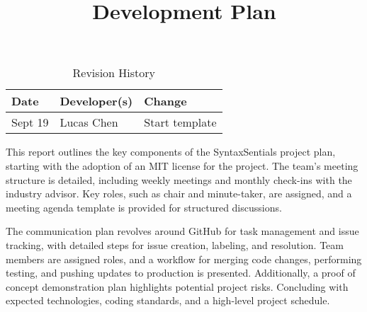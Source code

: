 \documentclass{article}
\title{Development Plan\\\progname}
\author{\authname}
\date{}
\begin{document}
\maketitle

\begin{table}[hp]
\caption{Revision History} \label{TblRevisionHistory}
\begin{tabularx}{\textwidth}{llX}
\toprule
\textbf{Date} & \textbf{Developer(s)} & \textbf{Change}\\
\midrule
Sept 19 & Lucas Chen & Start template\\
\bottomrule
\end{tabularx}
\end{table}

\newpage{}

This report outlines the key components of the SyntaxSentials project plan, 
starting with the adoption of an MIT license for the project. The team's meeting 
structure is detailed, including weekly meetings and monthly check-ins with the 
industry advisor. Key roles, such as chair and minute-taker, are assigned, and a 
meeting agenda template is provided for structured discussions.

The communication plan revolves around GitHub for task management and issue 
tracking, with detailed steps for issue creation, labeling, and resolution. 
Team members are assigned roles, and a workflow for merging code changes, 
performing testing, and pushing updates to production is presented. Additionally, 
a proof of concept demonstration plan highlights potential project risks. Concluding 
with expected technologies, coding standards, and a high-level project 
schedule.



\end{document}
